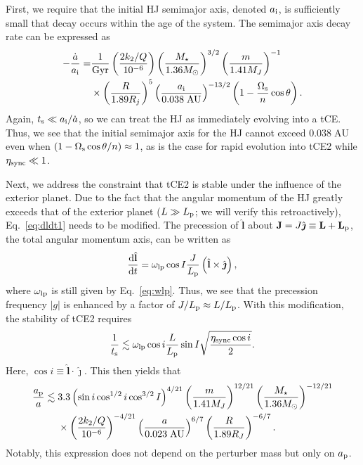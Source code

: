 \documentclass[
        fleqn,
        usenatbib,
    ]{mnras}
\newcommand*{\rd}[2]{\frac{\mathrm{d}#1}{\mathrm{d}#2}}
\newcommand*{\abs}[1]{\left|#1\right|}
\newcommand*{\p}[1]{\left(#1\right)}
\newcommand*{\bm}[1]{\mathbf{#1}}
\newcommand*{\uv}[1]{\hat{\boldsymbol{\mathbf{#1}}}}
\begin{document}
First, we require that the initial HJ semimajor axis, denoted $a_{\rm i}$, is
sufficiently small that decay occurs within the age of the system. The semimajor
axis decay rate can be expressed as
\begin{align}
    -\frac{\dot{a}}{a_{\rm i}}
        =& \frac{1}{\mathrm{Gyr}}
            \p{\frac{2k_2/Q}{10^{-6}}}
            \p{\frac{M_\star}{1.36 M_{\odot}}}^{3/2}
            \p{\frac{m}{1.41M_J}}^{-1}\nonumber\\
        &\times \p{\frac{R}{1.89R_j}}^5
            \p{\frac{a_{\rm i}}{0.038\;\mathrm{AU}}}^{-13/2}
            \p{1 - \frac{\Omega_{\rm s}}{n}\cos \theta}.
            \label{eq:hj_adot}
\end{align}
Again, $t_{\rm s} \ll a_{\rm i} / \dot{a}$, so we can treat the HJ as
immediately evolving into a tCE\@. Thus, we see that the initial semimajor axis
for the HJ cannot exceed $0.038\;\mathrm{AU}$ even when $\p{1 - \Omega_{\rm
s}\cos \theta/n} \approx 1$, as is the case for rapid evolution into tCE2 while
$\eta_{\rm sync} \ll 1$.

Next, we address the constraint that tCE2 is stable under the influence of the
exterior planet. Due to the fact that the angular momentum of the HJ greatly
exceeds that of the exterior planet ($L \gg L_{\rm p}$; we will verify this
retroactively), Eq.~\eqref{eq:dldt1} needs to be modified. The precession of
$\uv{l}$ about $\bm{J} = J\uv{\jmath} \equiv \bm{L} + \bm{L}_{\rm p}$, the total
angular momentum axis, can be written as
\begin{equation}
    \rd{\uv{l}}{t} = \omega_{\rm lp}\cos I \frac{J}{L_{\rm p}}
        \p{\uv{l} \times \uv{\jmath}},
\end{equation}
where $\omega_{\rm lp}$ is still given by Eq.~\eqref{eq:wlp}. Thus, we see that
the precession frequency $\abs{g}$ is enhanced by a factor of $J / L_{\rm p}
\approx L / L_{\rm p}$. With this modification, the stability of tCE2 requires
\begin{equation}
    \frac{1}{t_{\rm s}} \lesssim \omega_{\rm lp}\cos i \frac{L}{L_{\rm p}}
        \sin I \sqrt{\frac{\eta_{\rm sync}\cos i}{2}}.
\end{equation}
Here, $\cos i \equiv \uv{l} \cdot \uv{\jmath}$. This then yields that
\begin{align}
    \frac{a_{\rm p}}{a}
        \lesssim{}& 3.3 \p{\sin i \cos^{1/2} i \cos^{3/2} I}^{4/21}
            \p{\frac{m}{1.41 M_J}}^{12/21}
            \p{\frac{M_\star}{1.36 M_{\odot}}}^{-12/21}\nonumber\\
        &\times \p{\frac{2k_2/Q}{10^{-6}}}^{-4/21}
            \p{\frac{a}{0.023\;\mathrm{AU}}}^{6/7}
            \p{\frac{R}{1.89 R_J}}^{-6/7}.\label{eq:hj_tce2_stab}
\end{align}
Notably, this expression does not depend on the perturber mass but only on
$a_{\rm p}$.
\end{document}
